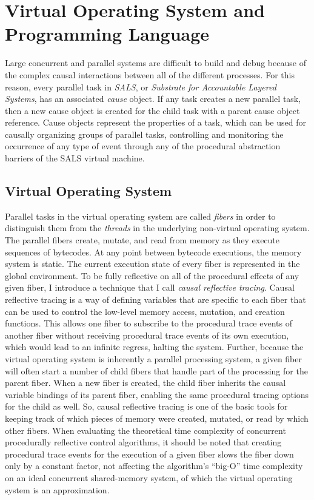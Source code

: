 \chapter{Virtual Operating System and Programming Language}
\label{appendix:virtual_operating_system_and_programming_language}

Large concurrent and parallel systems are difficult to build and debug
because of the complex causal interactions between all of the
different processes.  For this reason, every parallel task in
\emph{SALS}, or \emph{Substrate for Accountable Layered Systems}, has
an associated \emph{cause} object.  If any task creates a new parallel
task, then a new cause object is created for the child task with a
parent cause object reference.  Cause objects represent the properties
of a task, which can be used for causally organizing groups of
parallel tasks, controlling and monitoring the occurrence of any type
of event through any of the procedural abstraction barriers of the
SALS virtual machine.

\section{Virtual Operating System}

Parallel tasks in the virtual operating system are called
\emph{fibers} in order to distinguish them from the \emph{threads} in
the underlying non-virtual operating system.  The parallel fibers
create, mutate, and read from memory as they execute sequences of
bytecodes.  At any point between bytecode executions, the memory
system is static.  The current execution state of every fiber is
represented in the global environment.  To be fully reflective on all
of the procedural effects of any given fiber, I introduce a technique
that I call \emph{causal reflective tracing}.  Causal reflective
tracing is a way of defining variables that are specific to each fiber
that can be used to control the low-level memory access, mutation, and
creation functions.  This allows one fiber to subscribe to the
procedural trace events of another fiber without receiving procedural
trace events of its own execution, which would lead to an infinite
regress, halting the system.  Further, because the virtual operating
system is inherently a parallel processing system, a given fiber will
often start a number of child fibers that handle part of the
processing for the parent fiber.  When a new fiber is created, the
child fiber inherits the causal variable bindings of its parent fiber,
enabling the same procedural tracing options for the child as well.
So, causal reflective tracing is one of the basic tools for keeping
track of which pieces of memory were created, mutated, or read by
which other fibers.  When evaluating the theoretical time complexity
of concurrent procedurally reflective control algorithms, it should be
noted that creating procedural trace events for the execution of a
given fiber slows the fiber down only by a constant factor, not
affecting the algorithm's ``big-O'' time complexity on an ideal
concurrent shared-memory system, of which the virtual operating system
is an approximation.

